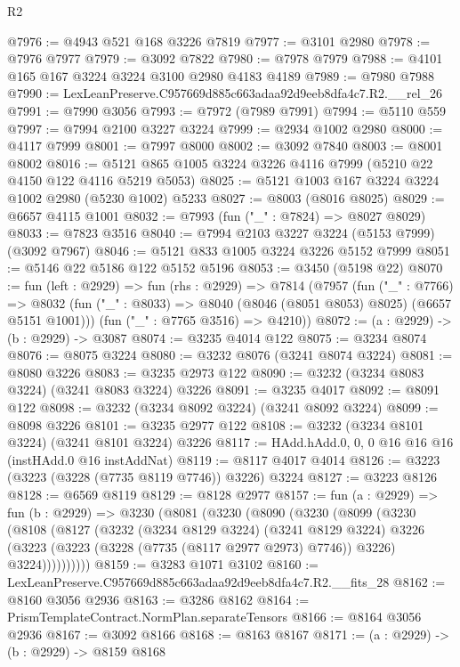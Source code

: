 \begin{lexlean}{R2}
\begin{coremodule}
@7976 := @4943 @521 @168 @3226 @7819
@7977 := @3101 @2980
@7978 := @7976 @7977
@7979 := @3092 @7822
@7980 := @7978 @7979
@7988 := @4101 @165 @167 @3224 @3224 @3100 @2980 @4183 @4189
@7989 := @7980 @7988
@7990 := LexLeanPreserve.C957669d885c663adaa92d9eeb8dfa4c7.R2.__rel_26
@7991 := @7990 @3056
@7993 := @7972 (@7989 @7991)
@7994 := @5110 @559
@7997 := @7994 @2100 @3227 @3224
@7999 := @2934 @1002 @2980
@8000 := @4117 @7999
@8001 := @7997 @8000
@8002 := @3092 @7840
@8003 := @8001 @8002
@8016 := @5121 @865 @1005 @3224 @3226 @4116 @7999 (@5210 @22 @4150 @122 @4116 @5219 @5053)
@8025 := @5121 @1003 @167 @3224 @3224 @1002 @2980 (@5230 @1002) @5233
@8027 := @8003 (@8016 @8025)
@8029 := @6657 @4115 @1001
@8032 := @7993 (fun ("_" : @7824) => @8027 @8029)
@8033 := @7823 @3516
@8040 := @7994 @2103 @3227 @3224 (@5153 @7999) (@3092 @7967)
@8046 := @5121 @833 @1005 @3224 @3226 @5152 @7999
@8051 := @5146 @22 @5186 @122 @5152 @5196
@8053 := @3450 (@5198 @22)
@8070 := fun (left : @2929) =>
  fun (rhs : @2929) =>
  @7814
    (@7957
      (fun ("_" : @7766) =>
      @8032 (fun ("_" : @8033) => @8040 (@8046 (@8051 @8053) @8025) (@6657 @5151 @1001)))
      (fun ("_" : @7765 @3516) => @4210))
@8072 := (a : @2929) -> (b : @2929) -> @3087
@8074 := @3235 @4014 @122
@8075 := @3234 @8074
@8076 := @8075 @3224
@8080 := @3232 @8076 (@3241 @8074 @3224)
@8081 := @8080 @3226
@8083 := @3235 @2973 @122
@8090 := @3232 (@3234 @8083 @3224) (@3241 @8083 @3224) @3226
@8091 := @3235 @4017
@8092 := @8091 @122
@8098 := @3232 (@3234 @8092 @3224) (@3241 @8092 @3224)
@8099 := @8098 @3226
@8101 := @3235 @2977 @122
@8108 := @3232 (@3234 @8101 @3224) (@3241 @8101 @3224) @3226
@8117 := HAdd.hAdd.{0, 0, 0} @16 @16 @16 (instHAdd.{0} @16 instAddNat)
@8119 := @8117 @4017 @4014
@8126 := @3223 (@3223 (@3228 (@7735 @8119 @7746)) @3226) @3224
@8127 := @3223 @8126
@8128 := @6569 @8119
@8129 := @8128 @2977
@8157 := fun (a : @2929) =>
  fun (b : @2929) =>
  @3230
    (@8081
      (@3230
        (@8090
          (@3230
            (@8099
              (@3230
                (@8108
                  (@8127
                    (@3232
                      (@3234 @8129 @3224)
                      (@3241 @8129 @3224)
                      @3226
                      (@3223 (@3223 (@3228 (@7735 (@8117 @2977 @2973) @7746)) @3226) @3224))))))))))
@8159 := @3283 @1071 @3102
@8160 := LexLeanPreserve.C957669d885c663adaa92d9eeb8dfa4c7.R2.__fits_28
@8162 := @8160 @3056 @2936
@8163 := @3286 @8162
@8164 := PrismTemplateContract.NormPlan.separateTensors
@8166 := @8164 @3056 @2936
@8167 := @3092 @8166
@8168 := @8163 @8167
@8171 := (a : @2929) -> (b : @2929) -> @8159 @8168

\end{coremodule}
\end{lexlean}

